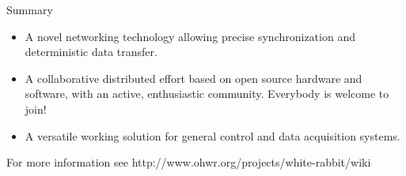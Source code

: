 \documentclass[compress, red]{beamer}
\begin{document}
\begin{frame}{Summary}
 \begin{itemize}
  \pause  
  \item A novel networking technology allowing precise synchronization
    and deterministic data transfer.
  \pause
\item A collaborative distributed effort based on open source hardware
  and software, with an active, enthusiastic community. Everybody is
  welcome to join!  \pause
   \item A versatile working solution for general control and data
    acquisition systems.
 \end{itemize}
 \pause
For more information see http://www.ohwr.org/projects/white-rabbit/wiki
\end{frame}
\end{document}
